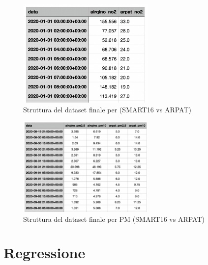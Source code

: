 \begin{figure}[H]
\centering
\captionsetup{justification=centering}
\includegraphics[width=0.6\textwidth,height=\textheight,keepaspectratio]{img/no2_ds_final}
\caption{Struttura del dataset finale per  (SMART16 vs ARPAT)}
\label{fig:no2-ds-final}
\end{figure}

\begin{figure}[H]
\centering
\captionsetup{justification=centering}
\includegraphics[width=0.6\textwidth,height=\textheight,keepaspectratio]{img/pm_ds_final}
\caption{Struttura del dataset finale per PM (SMART16 vs ARPAT)}
\label{fig:pm-ds-final}
\end{figure}

\section{Regressione}\label{sec:regressione}

%
%
%
%
%


